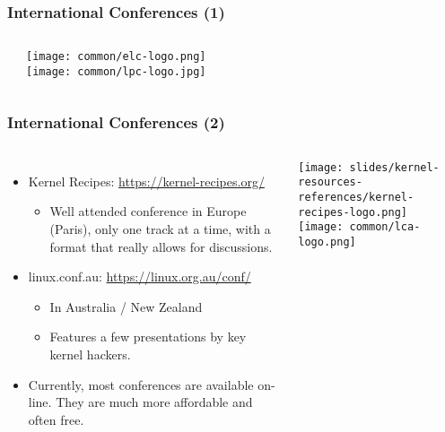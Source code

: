 \begin{frame}
  \frametitle{International Conferences (1)}
  \begin{columns}
  \begin{itemize}
    
    
  \end{itemize}
     \texttt{[image: common/elc-logo.png]}\\
     \vspace{1cm}
     \texttt{[image: common/lpc-logo.jpg]}\\
  \end{columns}
\end{frame}

\begin{frame}
  \frametitle{International Conferences (2)}
  \begin{columns}
    \begin{itemize}
      \item Kernel Recipes: \url{https://kernel-recipes.org/}
      \begin{itemize}
      \item Well attended conference in Europe (Paris), only one track
        at a time, with a format that really allows for discussions.
    \end{itemize}
    \item linux.conf.au: \url{https://linux.org.au/conf/}
      \begin{itemize}
      \item In Australia / New Zealand
      \item Features a few presentations by key kernel hackers.
      \end{itemize}
    \item Currently, most conferences are available on-line. They
	  are much more affordable and often free.
  \end{itemize}
     \texttt{[image: slides/kernel-resources-references/kernel-recipes-logo.png]}\\
     \vspace{1cm}
     \texttt{[image: common/lca-logo.png]}
  \end{columns}
\end{frame}

